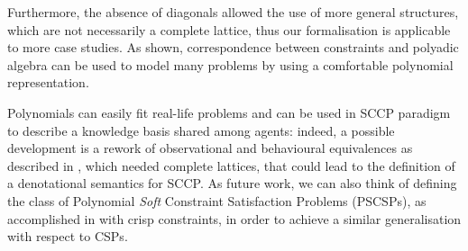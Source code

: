 \documentclass{llncs}
\begin{document}
Furthermore, the absence of diagonals allowed the use of more general structures, which are not 
necessarily a complete lattice, thus our formalisation is applicable to more case studies.
As shown, correspondence between constraints and polyadic algebra can be used to model
many problems by using a comfortable polynomial representation. 

Polynomials can easily fit real-life problems and can be used in SCCP paradigm to describe a knowledge
basis shared among agents: indeed, a possible development is a rework of observational
and behavioural equivalences as described in \cite{jlamp17}, which needed complete lattices,
that could lead to the definition of a denotational semantics for SCCP.
As future work, we can also think of defining the class of Polynomial \emph{Soft} Constraint Satisfaction Problems (PSCSPs), 
as accomplished in \cite{pcsp09} with crisp constraints, in order to achieve a similar generalisation with respect to CSPs.




\end{document}
